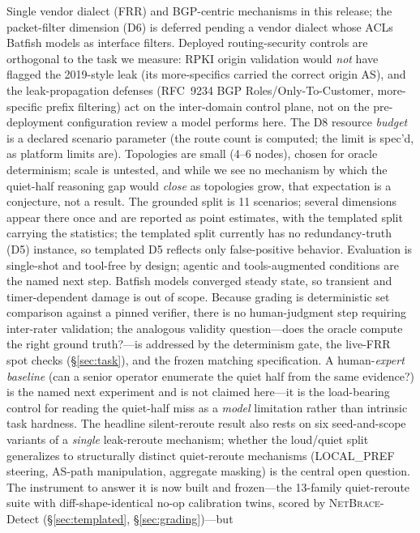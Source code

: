 \documentclass[11pt]{article}
\newcommand{\netbrace}{\textsc{NetBrace}}
\begin{document}
Single vendor dialect (FRR) and BGP-centric mechanisms in this release; the
packet-filter dimension (D6) is deferred pending a vendor dialect whose
ACLs Batfish models as interface filters. Deployed routing-security controls
are orthogonal to the task we measure: RPKI origin validation would \emph{not}
have flagged the 2019-style leak (its more-specifics carried the correct
origin AS), and the leak-propagation defenses (RFC~9234 BGP Roles/Only-To-Customer,
more-specific prefix filtering) act on the inter-domain control plane, not on
the pre-deployment configuration review a model performs here. The D8 resource \emph{budget} is a
declared scenario parameter (the route count is computed; the limit is
spec'd, as platform limits are). Topologies are small (4--6 nodes), chosen
for oracle determinism; scale is untested, and while we see no mechanism by
which the quiet-half reasoning gap would \emph{close} as topologies grow,
that expectation is a conjecture, not a result. The grounded split is
11 scenarios; several dimensions appear there once and are reported as point
estimates, with the templated split carrying the statistics; the templated
split currently has no redundancy-truth (D5) instance, so templated D5
reflects only false-positive behavior. Evaluation is single-shot and
tool-free by design; agentic and tools-augmented conditions are the named
next step. Batfish models converged steady state, so transient and
timer-dependent damage is out of scope. Because grading is deterministic
set comparison against a pinned verifier, there is no human-judgment step
requiring inter-rater validation; the analogous validity question---does
the oracle compute the right ground truth?---is addressed by the
determinism gate, the live-FRR spot checks (\S\ref{sec:task}), and the
frozen matching specification. A human-\emph{expert baseline} (can a senior
operator enumerate the quiet half from the same evidence?) is the named
next experiment and is not claimed here---it is the load-bearing control for
reading the quiet-half miss as a \emph{model} limitation rather than intrinsic
task hardness. The headline silent-reroute result also rests on six
seed-and-scope variants of a \emph{single} leak-reroute mechanism; whether the
loud/quiet split generalizes to structurally distinct quiet-reroute mechanisms
(LOCAL\_PREF steering, AS-path manipulation, aggregate masking) is the central
open question. The instrument to answer it is now built and frozen---the
13-family quiet-reroute suite with diff-shape-identical no-op calibration twins,
scored by \netbrace{}-Detect (\S\ref{sec:templated}, \S\ref{sec:grading})---but
\end{document}
